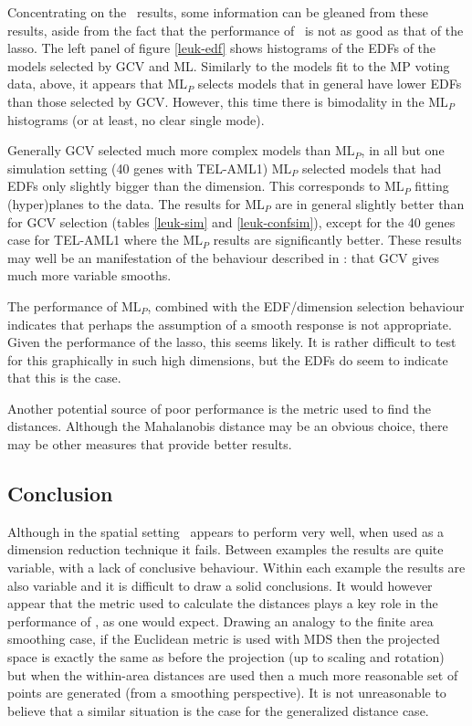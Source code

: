 Concentrating on the \mdsds\ results, some information can be gleaned from these results, aside from the fact that the performance of \mdsds\  is not as good as that of the lasso. The left panel of figure \ref{leuk-edf} shows histograms of the EDFs of the models selected by GCV and ML. Similarly to the models fit to the MP voting data, above, it appears that $\text{ML}_P$ selects models that in general have lower EDFs than those selected by GCV. However, this time there is bimodality in the $\text{ML}_P$ histograms (or at least, no clear single mode). 

Generally GCV selected much more complex models than $\text{ML}_P$, in all but one simulation setting (40 genes with TEL-AML1) $\text{ML}_P$ selected models that had EDFs only slightly bigger than the dimension. This corresponds to $\text{ML}_P$ fitting (hyper)planes to the data. The results for $\text{ML}_P$ are in general slightly better than for GCV selection (tables \ref{leuk-sim} and \ref{leuk-confsim}), except for the 40 genes case for TEL-AML1 where the $\text{ML}_P$ results are significantly better. These results may well be an manifestation of the behaviour described in : that GCV gives much more variable smooths. 

The performance of $\text{ML}_P$, combined with the EDF/dimension selection behaviour indicates that perhaps the assumption of a smooth response is not appropriate. Given the performance of the lasso, this seems likely. It is rather difficult to test for this graphically in such high dimensions, but the EDFs do seem to indicate that this is the case.

Another potential source of poor performance is the metric used to find the distances. Although the Mahalanobis distance may be an obvious choice, there may be other measures that provide better results.


\subsection{Conclusion}

Although in the spatial setting \mdsds\ appears to perform very well, when used as a dimension reduction technique it fails. Between examples the results are quite variable, with a lack of conclusive behaviour. Within each example the results are also variable and it is difficult to draw a solid conclusions. It would however appear that the metric used to calculate the distances plays a key role in the performance of \mdsds, as one would expect. Drawing an analogy to the finite area smoothing case, if the Euclidean metric is used with MDS then the projected space is exactly the same as before the projection (up to scaling and rotation) but when the within-area distances are used then a much more reasonable set of points are generated (from a smoothing perspective). It is not unreasonable to believe that a similar situation is the case for the generalized distance case.

